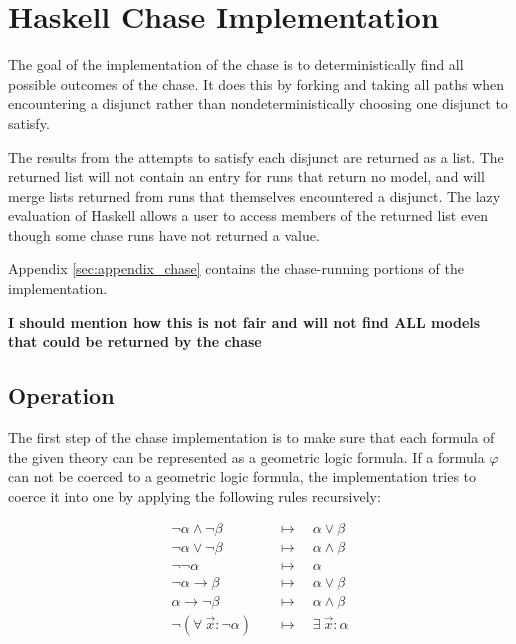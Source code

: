 \section{Haskell Chase Implementation}
\label{sec:implementation}

	The goal of the implementation of the chase is to deterministically find
	all possible outcomes of the chase. It does this by forking and taking all
	paths when encountering a disjunct rather than nondeterministically
	choosing one disjunct to satisfy.

	The results from the attempts to satisfy each disjunct are returned as a
	list. The returned list will not contain an entry for runs that return no
	model, and will merge lists returned from runs that themselves encountered
	a disjunct. The lazy evaluation of Haskell allows a user to access members
	of the returned list even though some chase runs have not returned a value.

	Appendix \ref{sec:appendix_chase} contains the chase-running portions of the
	implementation.

	\textbf{ I should mention how this is not fair and will not find ALL models
	that could be returned by the chase }

	\subsection{Operation}

		The first step of the chase implementation is to make sure that each
		formula of the given theory can be represented as a geometric logic
		formula. If a formula $\varphi$ can not be coerced to a geometric logic
		formula, the implementation tries to coerce it into one by applying the
		following rules recursively:

		\begin{align*}
		\neg\alpha \wedge \neg\beta         \quad & \mapsto \quad \alpha \vee \beta        \\
		\neg\alpha \vee \neg\beta           \quad & \mapsto \quad \alpha \wedge \beta      \\
		\neg\neg\alpha                      \quad & \mapsto \quad \alpha                   \\
		\neg\alpha \to \beta                \quad & \mapsto \quad \alpha \vee \beta        \\
		\alpha \to \neg\beta                \quad & \mapsto \quad \alpha \wedge \beta      \\
		\neg(\forall\ \vec{x} : \neg\alpha) \quad & \mapsto \quad \exists\ \vec{x} : \alpha
		\end{align*}

